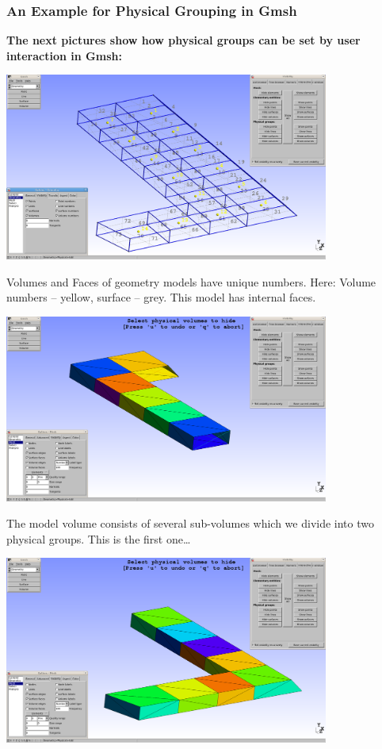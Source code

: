 \begin{frame}
  \frametitle<presentation>{An Example for Physical Grouping in Gmsh}
  \textbf{The next pictures show how physical groups can be set by user interaction in
  Gmsh:}
  \begin{center}
    \includegraphics[width=0.8\textwidth]{./EPS/L/L_numbers_vols_faces}
  \end{center}
  Volumes and Faces of geometry models have unique numbers. Here: Volume numbers --
  yellow, surface -- grey. This model has internal faces.
  \begin{center}
    \includegraphics[width=0.8\textwidth]{./EPS/L/L_volgroup1}
  \end{center}
  The model volume consists of several sub-volumes which we divide into two
  physical groups. This is the first one\ldots
  \begin{center}
    \includegraphics[width=0.8\textwidth]{./EPS/L/L_volgroup2}

\end{center}
\end{frame}
